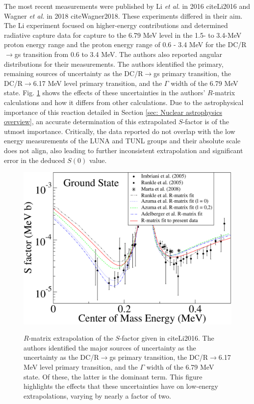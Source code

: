 The most recent measurements were published by Li \textit{et al.} in 2016 cite{Li2016} and Wagner \textit{et al.} in 2018 cite{Wagner2018}. These experiments differed in their aim. The Li experiment focused on higher-energy contributions and determined radiative capture data for capture to the 6.79 MeV level in the 1.5- to 3.4-MeV proton energy range and the proton energy range of 0.6 - 3.4 MeV for the DC/R$\rightarrow$gs transition from 0.6 to 3.4 MeV. The authors also reported angular distributions for their measurements. The authors identified the primary, remaining sources of uncertainty as the DC/R$\rightarrow$gs primary transition, the DC/R$\rightarrow$6.17 MeV level primary transition, and the $\Gamma$ width of the 6.79 MeV state. Fig. \ref{fig: QianRmatrix} shows the effects of these uncertainties in the authors' $R$-matrix calculations and how it differs from other calculations. Due to the astrophysical importance of this reaction detailed in Section \ref{sec: Nuclear astrophysics overview}, an accurate determination of this extrapolated $S$-factor is of the utmost importance. Critically, the data reported do not overlap with the low energy measurements of the LUNA and TUNL groups and their absolute scale does not align, also leading to further inconsistent extrapolation and significant error in the deduced $S(0)$ value.

\begin{figure}
\includegraphics[width=\linewidth]{figures/qianSfactor.pdf}
\label{fig: QianRmatrix}
\caption{$R$-matrix extrapolation of the $S$-factor given in cite{Li2016}. The authors identified the major sources of uncertainty as the uncertainty as the DC/R$\rightarrow$gs primary transition, the DC/R$\rightarrow$6.17 MeV level primary transition, and the $\Gamma$ width of the 6.79 MeV state. Of these, the latter is the dominant term. This figure highlights the effects that these uncertainties have on low-energy extrapolations, varying by nearly a factor of two. }
\end{figure}

